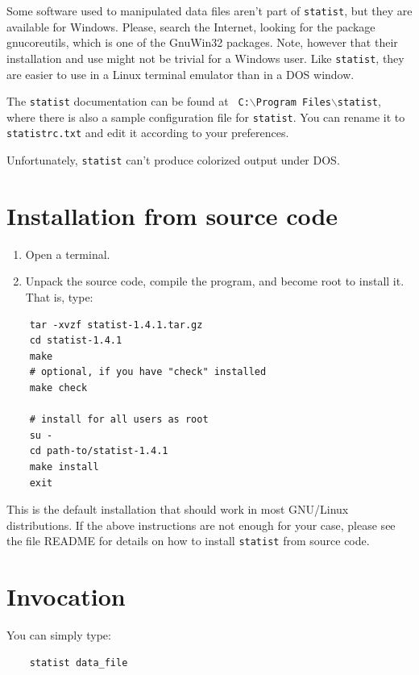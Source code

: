 \documentclass[12pt,english]{article}
\newcommand{\st}{{\tt sta\-tist} }
\begin{document}
Some software used to manipulated data files aren't part of
{\tt sta\-tist}, but they are available for Windows. Please, search the
Internet, looking for the package gnucoreutils, which is one
of the GnuWin32 packages. Note, however that their
installation and use might not be trivial for a Windows
user.  Like {\tt sta\-tist}, they are easier to use in a
Linux terminal emulator than in a DOS window.

The \st documentation can be found at {\tt
C:$\backslash$Program Files$\backslash$statist}, where there
is also a sample configuration file for {\tt sta\-tist}. You
can rename it to {\tt statistrc.txt} and edit it according
to your preferences.

Unfortunately, \st can't produce colorized output under DOS.

\section{Installation from source code}

\begin{enumerate}

\item Open a terminal.

\item Unpack the source code, compile the program, and
become root to install it. That is, type:

\end{enumerate}

\begin{verbatim}
    tar -xvzf statist-1.4.1.tar.gz
    cd statist-1.4.1
    make
    # optional, if you have "check" installed
    make check

    # install for all users as root
    su -
    cd path-to/statist-1.4.1
    make install
    exit

\end{verbatim}

This is the default installation that should work in most
GNU/Linux distributions. If the above instructions are not
enough for your case, please see the file README for details
on how to install \st from source code.

\section{Invocation}

You can simply type:
\begin{verbatim}
    statist data_file
\end{verbatim}
\end{document}
